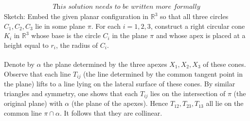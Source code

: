 \begin{solution}
    \[
        \substack{\textit{This solution needs to be written more formally}}
    \]
    Sketch: Embed the given planar configuration in \( \mathbb{R}^3 \) so that all three circles \( C_{1}, C_{2}, C_{3} \) lie in some plane \( \pi \). For each \( i = 1,2,3 \), construct a right circular cone \( K_{i} \) in \( \mathbb{R}^3 \) whose base is the circle \( C_i \) in the plane \( \pi \) and whose apex is placed at a height equal to \( r_i \), the radius of \( C_i \).
    \\\\
    Denote by \( \alpha \) the plane determined by the three apexes \( X_{1}, X_{2}, X_{3} \) of these cones. Observe that each line \( T_{ij} \) (the line determined by the common tangent point in the plane) lifts to a line lying on the lateral surface of these cones. By similar triangles and symmetry, one shows that each \( T_{ij} \) lies on the intersection of \( \pi \) (the original plane) with \( \alpha \) (the plane of the apexes). Hence \( T_{12}, T_{23}, T_{13} \) all lie on the common line \( \pi \cap \alpha \). It follows that they are collinear.
\end{solution}
